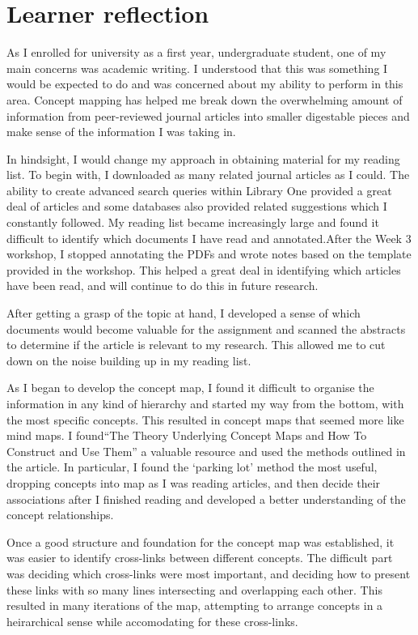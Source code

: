 \documentclass[a4paper, 12pt]{article}
\begin{document}
\section{Learner reflection}

As I enrolled for university as a first year, undergraduate student, one of my main concerns was academic writing. I understood that this was something I would be expected to do and was concerned about my ability to perform in this area. Concept mapping has helped me break down the overwhelming amount of information from peer-reviewed journal articles into smaller digestable pieces and make sense of the information I was taking in.

In hindsight, I would change my approach in obtaining material for my reading list. To begin with, I downloaded as many related journal articles as I could. The ability to create advanced search queries within Library One provided a great deal of articles and some databases also provided related suggestions which I constantly followed. My reading list became increasingly large and found it difficult to identify which documents I have read and annotated.After the Week 3 workshop, I stopped annotating the PDFs and wrote notes based on the template provided in the workshop. This helped a great deal in identifying which articles have been read, and will continue to do this in future research. 

After getting a grasp of the topic at hand, I developed a sense of which documents would become valuable for the assignment and scanned the abstracts to determine if the article is relevant to my research. This allowed me to cut down on the noise building up in my reading list.

As I began to develop the concept map, I found it difficult to organise the information in any kind of hierarchy and started my way from the bottom, with the most specific concepts. This resulted in concept maps that seemed more like mind maps. I found\citet{Novak2006}``The Theory Underlying Concept Maps and How To Construct and Use Them'' a valuable resource and used the methods outlined in the article. In particular, I found the `parking lot' method the most useful, dropping concepts into map as I was reading articles, and then decide their associations after I finished reading and developed a better understanding of the concept relationships.

Once a good structure and foundation for the concept map was established, it was easier to identify cross-links between different concepts. The difficult part was deciding which cross-links were most important, and deciding how to present these links with so many lines intersecting and overlapping each other. This resulted in many iterations of the map, attempting to arrange concepts in a heirarchical sense while accomodating for these cross-links.
\end{document}
